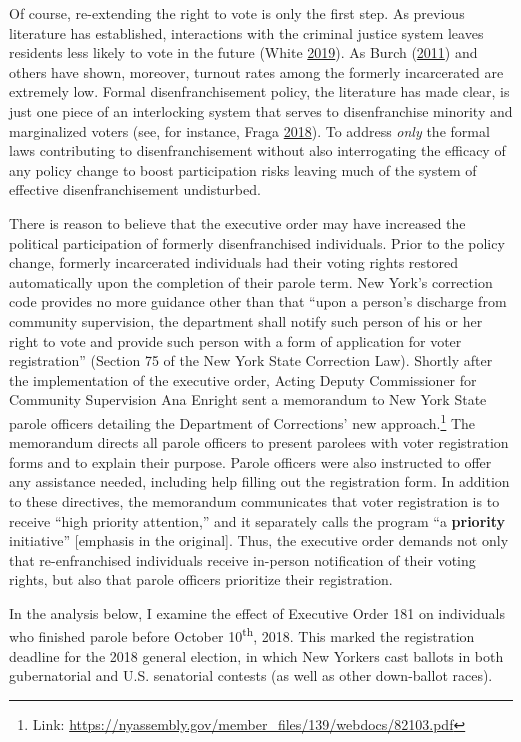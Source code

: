 \documentclass[12pt,]{article}
\let\rmarkdownfootnote\footnote%
\def\footnote{\protect\rmarkdownfootnote}
\begin{document}
Of course, re-extending the right to vote is only the first step. As previous literature has established, interactions with the criminal justice system leaves residents less likely to vote in the future (White \protect\hyperlink{ref-White2019}{2019}). As Burch (\protect\hyperlink{ref-Burch2011}{2011}) and others have shown, moreover, turnout rates among the formerly incarcerated are extremely low. Formal disenfranchisement policy, the literature has made clear, is just one piece of an interlocking system that serves to disenfranchise minority and marginalized voters (see, for instance, Fraga \protect\hyperlink{ref-Fraga2018}{2018}). To address \emph{only} the formal laws contributing to disenfranchisement without also interrogating the efficacy of any policy change to boost participation risks leaving much of the system of effective disenfranchisement undisturbed.

There is reason to believe that the executive order may have increased the political participation of formerly disenfranchised individuals. Prior to the policy change, formerly incarcerated individuals had their voting rights restored automatically upon the completion of their parole term. New York's correction code provides no more guidance other than that ``upon a person's discharge from community supervision, the department shall notify such person of his or her right to vote and provide such person with a form of application for voter registration'' (Section 75 of the New York State Correction Law). Shortly after the implementation of the executive order, Acting Deputy Commissioner for Community Supervision Ana Enright sent a memorandum to New York State parole officers detailing the Department of Corrections' new approach.\footnote{Link: \url{https://nyassembly.gov/member_files/139/webdocs/82103.pdf}} The memorandum directs all parole officers to present parolees with voter registration forms and to explain their purpose. Parole officers were also instructed to offer any assistance needed, including help filling out the registration form. In addition to these directives, the memorandum communicates that voter registration is to receive ``high priority attention,'' and it separately calls the program ``a \textbf{priority} initiative'' {[}emphasis in the original{]}. Thus, the executive order demands not only that re-enfranchised individuals receive in-person notification of their voting rights, but also that parole officers prioritize their registration.

In the analysis below, I examine the effect of Executive Order 181 on individuals who finished parole before October 10\textsuperscript{th}, 2018. This marked the registration deadline for the 2018 general election, in which New Yorkers cast ballots in both gubernatorial and U.S. senatorial contests (as well as other down-ballot races).
\end{document}
